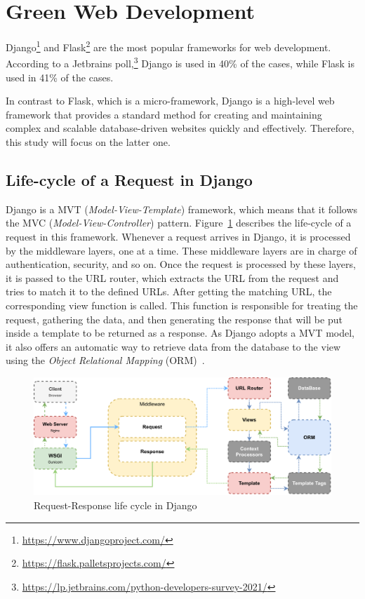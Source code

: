 \section{Green Web Development}\label{sec:webdev}

Django\footnote{\url{https://www.djangoproject.com/}} and Flask\footnote{\url{https://flask.palletsprojects.com/}} are the most popular frameworks for web development.
According to a Jetbrains poll,\footnote{\url{https://lp.jetbrains.com/python-developers-survey-2021/}} Django is used in 40\% of the cases, while Flask is used in 41\% of the cases.

In contrast to Flask, which is a micro-framework, Django is a high-level web framework that provides a standard method for creating and maintaining complex and scalable database-driven websites quickly and effectively.
Therefore, this study will focus on the latter one.

\subsection{Life-cycle of a Request in Django}
Django is a MVT (\emph{Model-View-Template}) framework, which means that it follows the MVC (\emph{Model-View-Controller}) pattern.
Figure~\ref{fig:django-life-cycle} describes the life-cycle of a request in this framework.
Whenever a request arrives in Django, it is processed by the middleware layers, one at a time.
These middleware layers are in charge of authentication, security, and so on.
Once the request is processed by these layers, it is passed to the URL router, which extracts the URL from the request and tries to match it to the defined URLs.
After getting the matching URL, the corresponding view function is called.
This function is responsible for treating the request, gathering the data, and then generating the response that will be put inside a template to be returned as a response.
As Django adopts a MVT model, it also offers an automatic way to retrieve data from the database to the view using the \emph{Object Relational Mapping} (ORM)~\cite{o2008object}.

\begin{figure}[hbt]
    \centering
    \includegraphics[width=\linewidth]{imgs/django_request_lifecycle}
    \caption{Request-Response life cycle in Django}
    \label{fig:django-life-cycle}
\end{figure}

